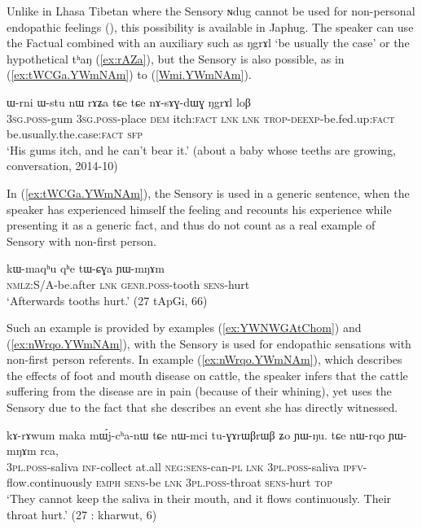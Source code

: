 \documentclass[oldfontcommands,oneside,a4paper,11pt]{article}
\newcommand{\ipa}[1]{{\phon \mbox{#1}}} %
\newcommand{\refb}[1]{(\ref{#1})}
\newcommand{\factual}[1]{\textsc{:fact}}
\begin{document}
Unlike in Lhasa Tibetan where the Sensory \ipa{ɴdug} cannot be used for non-personal endopathic feelings (\citealt{tournadre14evidentiality}), this possibility is available in Japhug. The speaker can use the Factual combined with an auxiliary such as \ipa{ŋgrɤl}  `be usually the case' or the hypothetical \ipa{tʰaŋ} (\ref{ex:rAZa}), but the Sensory is also possible, as in \refb{ex:tWCGa.YWmNAm} to \refb{Wmi.YWmNAm}.


\begin{exe}
\ex \label{ex:rAZa}
\gll
\ipa{ɯ-rni}  	\ipa{ɯ-stu}  	\ipa{nɯ}  	\ipa{rɤʑa}  	\ipa{tɕe}  	\ipa{tɕe}  	\ipa{nɤ-sɤɣ-dɯɣ}  	\ipa{ŋgrɤl}  	\ipa{loβ}  \\
\textsc{3sg.poss}-gum \textsc{3sg.poss}-place \textsc{dem} itch\factual{} \textsc{lnk} \textsc{lnk} \textsc{trop-deexp}-be.fed.up\factual{} be.usually.the.case\factual{} \textsc{sfp} \\
\glt `His gums itch, and he can't bear it.' (about a baby whose teeths are growing, conversation, 2014-10)
\end{exe}

In \refb{ex:tWCGa.YWmNAm}, the Sensory is used in a generic sentence, when the speaker has experienced himself the feeling and recounts his experience while presenting it as a generic fact, and thus do not count as a real example of Sensory with non-first person.

\begin{exe}
\ex \label{ex:tWCGa.YWmNAm}
\gll
\ipa{kɯ-maqʰu}  	\ipa{qʰe}  	\ipa{tɯ-ɕɣa}  	\ipa{ɲɯ-mŋɤm}  \\
\textsc{nmlz}:S/A-be.after \textsc{lnk} \textsc{genr.poss}-tooth \textsc{sens}-hurt \\
\glt `Afterwards tooths hurt.' (27 tApGi, 66)
\end{exe}

Such an example is provided by examples \refb{ex:YWNWGAtChom} and \refb{ex:nWrqo.YWmNAm},  with the Sensory is used for endopathic sensations with non-first person referents. In example \refb{ex:nWrqo.YWmNAm}, which describes the effects of foot and mouth disease on cattle, the speaker  infers that the cattle suffering from the disease are in pain (because of their whining), yet uses the Sensory due to the fact that she describes an event she has directly witnessed. 

\begin{exe}
\ex \label{ex:nWrqo.YWmNAm}
\gll \ipa{nɯ-mci} 	\ipa{kɤ-rɤwum} 	\ipa{maka} 	\ipa{mɯ́j-cʰa-nɯ} 	\ipa{tɕe} 	\ipa{nɯ-mci} 	\ipa{tu-ɣɤrɯβrɯβ} 	\ipa{ʑo} 	\ipa{ɲɯ-ŋu.}  
\ipa{tɕe} 	\ipa{nɯ-rqo} 	\ipa{ɲɯ-mŋɤm} 	\ipa{rca,} \\
\textsc{3pl.poss}-saliva \textsc{inf}-collect at.all \textsc{neg:sens}-can-\textsc{pl} \textsc{lnk} \textsc{3pl.poss}-saliva \textsc{ipfv}-flow.continuously \textsc{emph} \textsc{sens}-be \textsc{lnk} \textsc{3pl.poss}-throat \textsc{sens}-hurt \textsc{top}  \\
\glt `They cannot keep the saliva in their mouth, and it flows continuously. Their throat hurt.' (27 : kharwut, 6)
\end{exe}
\end{document}
